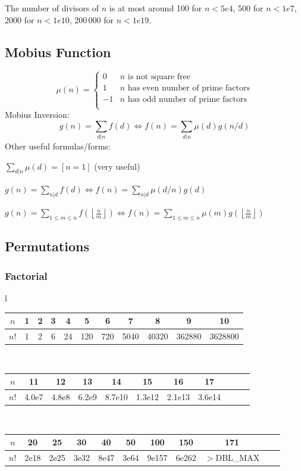 \begin{multicols}{\Columns}
	The number of divisors of $n$ is at most around 100 for $n < 5e4$, 500 for $n < 1e7$, 2000 for $n < 1e10$, 200\,000 for $n < 1e19$.

\subsection{Mobius Function}
\[
	\mu(n) = \begin{cases} 0 & n \textrm{ is not square free}\\ 1 & n \textrm{ has even number of prime factors}\\ -1 & n \textrm{ has odd number of prime factors}\\\end{cases}
\]
  Mobius Inversion:
  \[ g(n) = \sum_{d|n} f(d) \Leftrightarrow f(n) = \sum_{d|n} \mu(d)g(n/d) \]
  Other useful formulas/forms:

  $ \sum_{d | n} \mu(d) = [ n = 1] $ (very useful)

  $ g(n) = \sum_{n|d} f(d) \Leftrightarrow f(n) = \sum_{n|d} \mu(d/n)g(d)$

 $ g(n) = \sum_{1 \leq m \leq n} f(\left\lfloor\frac{n}{m}\right \rfloor ) \Leftrightarrow f(n) = \sum_{1\leq m\leq n} \mu(m)g(\left\lfloor\frac{n}{m}\right\rfloor)$



\subsection{Permutations}
	\subsubsection{Factorial}
		\begin{center}
\begin{tabular}{l}
\begin{tabular}{c|c@{\ }c@{\ }c@{\ }c@{\ }c@{\ }c@{\ }c@{\ }c@{\ }c@{\ }c}
$n$  & 1 & 2 & 3 & 4  & 5   & 6   & 7    & 8     & 9      & 10\\
\hline
$n!$ & 1 & 2 & 6 & 24 & 120 & 720 & 5040 & 40320 & 362880 & 3628800\\
\end{tabular}\\
\begin{tabular}{c|c@{\ }c@{\ }c@{\ }c@{\ }c@{\ }c@{\ }c@{\ }c@{\ }c@{\ }c}
$n$  & 11    & 12    & 13    & 14     & 15     & 16     & 17\\
\hline
$n!$ & 4.0e7 & 4.8e8 & 6.2e9 & 8.7e10 & 1.3e12 & 2.1e13 & 3.6e14\\
\end{tabular}\\
\begin{tabular}{c|c@{\ }c@{\ }c@{\ }c@{\ }c@{\ }c@{\ }c@{\ }c@{\ }c@{\ }c}
$n$  & 20   & 25   & 30   & 40   & 50   & 100   & 150   & 171\\
\hline
$n!$ & 2e18 & 2e25 & 3e32 & 8e47 & 3e64 & 9e157 & 6e262 & \scriptsize{$>$DBL\_MAX}\\
\end{tabular}
\end{tabular}
\end{center}


\end{multicols}
